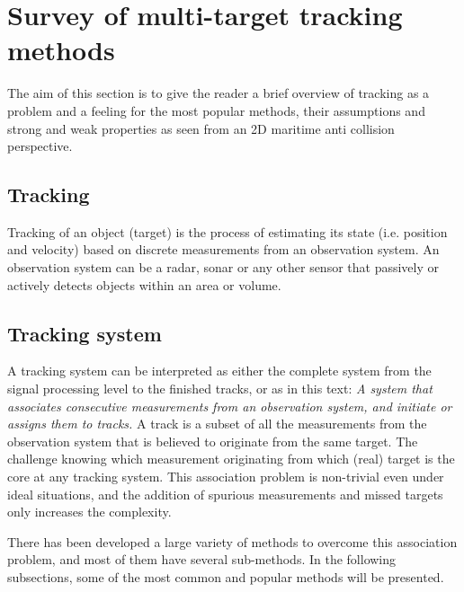 
\section{Survey of multi-target tracking methods}
\label{sec:survey}
The aim of this section is to give the reader a brief overview of tracking as a problem and a feeling for the most popular methods, their assumptions and strong and weak properties as seen from an 2D maritime anti collision perspective.

\subsection{Tracking}
Tracking of an object (target) is the process of estimating its state (i.e. position and velocity) based on discrete measurements from an observation system. An observation system can be a radar, sonar or any other sensor that passively or actively detects objects within an area or volume.

\subsection{Tracking system}
A tracking system can be interpreted as either the complete system from the signal processing level to the finished tracks, or as in this text: \emph{A system that associates consecutive measurements from an observation system, and initiate or assigns them to tracks.} A track is a subset of all the measurements from the observation system that is believed to originate from the same target. The challenge knowing which measurement originating from which (real) target is the core at any tracking system. This association problem is non-trivial even under ideal situations, and the addition of spurious measurements and missed targets only increases the complexity.

There has been developed a large variety of methods to overcome this association problem, and most of them have several sub-methods. In the following subsections, some of the most common and popular methods will be presented.

